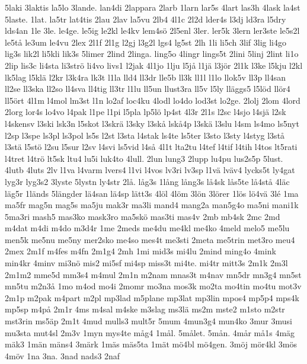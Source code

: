 {{5laki
3laktis
la5lo
3lande.
lan4di
2lappara
2larb
1larn
lar5s
4lart
las3h
4lask
la4st
5laste.
1lat.
la5tr
lat4tis
2lau
2lav
la5vu
2lb4
4l1c
2l2d
lder4s
l3dj
ld3ra
l5dry
lds4an
1le
3le.
le4ge.
le5ig
le2kl
le4kv
lem4s^^f6
2l5enl
3ler.
ler5k
3lern
ler3ste
le5s2l
le5t^^e5
le3um
le4vu
2lex
2l1f
2l1g
l2gj
l3g2l
lgs4
lg5st
2lh
1li
li5ch
3lif
3lig
li4go
lig3s
lik2l
li5kli
lik3s
5limer
2lind
2linga.
ling5o
4lingr
lings5t
2lini
5linj
2lint
li1o
2lip
lis3c
li4sta
li3str^^f6
li4vo
livs1
l2jak
4l1jo
1lju
l5j^^e5
l1j^^e4
l3j^^f6r
2l1k
l3ke
l5kju
l2kl
lk5lag
l5kl^^e4
l2kr
l3k4ra
lk3t
l1la
lld4
ll3dr
lle5b
ll3k
ll1l
l1lo
llok5v
ll3p
ll4san
ll2se
ll3ska
ll2so
ll4sva
ll4tig
ll3tr
l1lu
ll5un
llust3ra
ll5v
l5ly
ll^^e4ggs5
l5l^^f6d
ll^^f6r4
ll5^^f6rt
4l1m
l4mol
lm3st
l1n
lo2af
loc4ku
4lodl
lo4do
lod3st
lo2ge.
2lolj
2lom
4lord
2lorg
lor4s
lo4vo
l4pak
l1pe
l1pi
l5pla
lp5l^^f6
lp4st
4l3r
2l1s
l2sc
l4sjo
l4sj^^e4
l2sk
l4skensv
l3ski
lsk3n
l5skot
l3skr^^e4
l3sky
l3sk^^e5
lsk^^e54p
l3sk^^e4
l3slu
l4sm
ls4mo
ls5nyt
l2sp
l3spe
ls3pl
ls3pol
ls5s
l2st
l3sta
l4stak
ls4te
ls5ter
l3sto
l3sty
l4styg
l3st^^e5
l3st^^e4
l5st^^f6
l2su
l5sur
l2sv
l4svi
ls5vid
l4s^^e5
4l1t
lta2tu
l4tef
l4tif
l4tih
l4tos
lt5rati
l4tret
l4tr^^f6
lt5sk
ltu4
lu5i
luk4to
4lull.
2lun
lung3
2lupp
lu4pu
lus2s5p
5lust.
4lutb
4luts
2lv
l1va
l4varm
lvers4
l1vi
l4vos
lv3ri
lv3sp
l1v^^e4
lv^^e4v4
lycks5t
ly4gat
lyg3r
lyg3s2
3lyste
5lystn
ly4str
2l^^e5.
l^^e5g3s
1l^^e5ng
l^^e5ng3s
l^^e54sk
l^^e5s5te
l^^e54st^^e5
4l^^e4c
l^^e4g5r
1l^^e4nds
5l^^e4ngder
l^^e44san
l^^e44sp
l^^e4tt3s
4l^^f6l
4l^^f6m
3l^^f6n
3l^^f6rer
1l^^f6s
l^^f64v^^e4
3l^^e9
1ma
ma5fr
mag5n
mag5s
ma5ju
mak3r
ma3li
mand4
mang2a
man5g4o
ma5ni
mani1k
5ma3ri
mash5
mas3ko
mask3ro
ma5sk^^f6
mas3ti
mas4v
2mb
mb4sk
2mc
2md
m4dat
m4di
m4do
m3d4r
1me
2meds
me4du
me4kl
me4ko
4meld
melo5
me5lu
men5k
me5nu
me5ny
mer2sko
me4so
mes4t
me3sti
2meta
me5trin
met3ro
meu4
2mex
2m1f
m4fes
m4fn
2m1g4
2mh
1mi
mid3s
mi4lu
2mind
ming4o
4mink
min4kr
4minv
mi3n^^f6
mis2
mi5sf
mi4sp
miss3t
mi4te.
mi4tr
mitt3s
2m1k
2m3l
2m1m2
mme5d
mm3s4
m4mul
2m1n
m2nam
mnas3t
m4nav
mn5dr
mn3g4
mn5st
mn5tu
m2n3^^e5
1mo
m4od
mo4i
2momr
mo3na
mos3k
mo2ta
mo4tin
mo4tu
mot3v
2m1p
m2pak
m4part
m2pl
mp3lad
m5plane
mp3lat
mp3lin
mpos4
mp5p4
mps4k
mp5sp
m4p^^e5
2m1r
4ms
m4sal
m4ske
m3slag
ms3l^^e4
ms2m
mste2
m1sto
m2str
mst3rin
ms5^^e4p
2m1t
4mud
mulls3
mult5r
5mum
4mun3g4
mun4ko
3mur
3musi
mu3sta
mut4sl
2m3v
1myn
mys4te
m^^e5g4
1m^^e5l.
5m^^e5let.
5m^^e5n.
4m^^e5r
m^^e51s
4m^^e4g
m^^e4k3
1m^^e4n
m^^e4ns4
3m^^e4rk
1m^^e4s
m^^e4s5ta
1m^^e4t
m^^f64bl
m^^f64gen.
3m^^f6j
m^^f6r4kl
3m^^f6s
4m^^f6v
1na
3na.
3nad
nads3
2naf
}}
